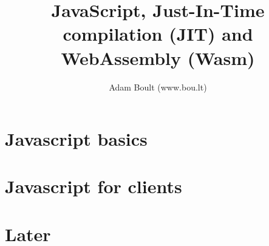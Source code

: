 \documentclass[oneside]{book}
\begin{document}
\author{Adam Boult (www.bou.lt)}
\title{JavaScript, Just-In-Time compilation (JIT) and WebAssembly (Wasm)}
\maketitle

\setcounter{tocdepth}{0}
\tableofcontents



\part{Javascript basics}







\part{Javascript for clients}




\part{Later}

\end{document}

